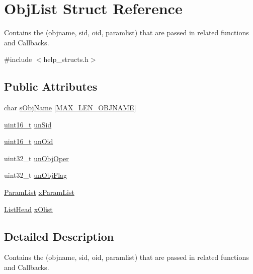\hypertarget{structObjList}{\section{Obj\-List Struct Reference}
\label{structObjList}
}


Contains the (objname, sid, oid, paramlist) that are passed in related functions and Callbacks.  




{\ttfamily \#include $<$help\-\_\-structs.\-h$>$}

\subsection*{Public Attributes}
\begin{DoxyCompactItemize}
\item 
char \hyperlink{structObjList_aa8e6af61ee6cc0ab577074e55b3aa1dd}{s\-Obj\-Name} \mbox{[}\hyperlink{group__LIBHELP_ga635a84c0e3ae6e922f824064a006500d}{M\-A\-X\-\_\-\-L\-E\-N\-\_\-\-O\-B\-J\-N\-A\-M\-E}\mbox{]}
\item 
\hyperlink{commondefs_8h_adf4d876453337156dde61095e1f20223}{uint16\-\_\-t} \hyperlink{structObjList_a450648612115440cad362b3a31a1e1df}{un\-Sid}
\item 
\hyperlink{commondefs_8h_adf4d876453337156dde61095e1f20223}{uint16\-\_\-t} \hyperlink{structObjList_ac83adce2eb39530e198b835134744ce7}{un\-Oid}
\item 
uint32\-\_\-t \hyperlink{structObjList_a74aa7207a30c674333067077083e43d4}{un\-Obj\-Oper}
\item 
uint32\-\_\-t \hyperlink{structObjList_ac19269ddfee19096edfdf8ff4fa3d8a9}{un\-Obj\-Flag}
\item 
\hyperlink{structParamList}{Param\-List} \hyperlink{structObjList_a9de5f33293ccef1f9fc9b9ef3bf1c358}{x\-Param\-List}
\item 
\hyperlink{group__LIBHELP_ga73f73d414f252ff46652f16495641187}{List\-Head} \hyperlink{structObjList_afc09cd5ee68143c7785a56e4915b42a1}{x\-Olist}
\end{DoxyCompactItemize}


\subsection{Detailed Description}
Contains the (objname, sid, oid, paramlist) that are passed in related functions and Callbacks. 

